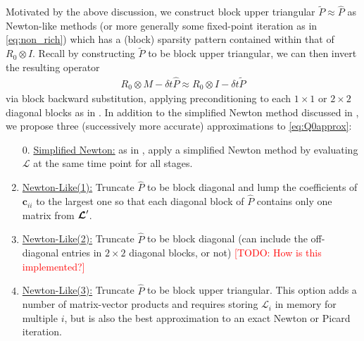 \documentclass[review]{siamart}
\makeatletter
\newcommand{\todo}[1]{\textcolor{red}{[TODO\@: #1]}}
\makeatother
\begin{document}
Motivated by the above discussion, we construct {block upper triangular}
$\widetilde{P} \approx \widehat{P}$ as Newton-like methods (or more
generally some fixed-point iteration as in \eqref{eq:non_rich}) which has
a (block) sparsity pattern contained within that of $R_0 \otimes I$. Recall
by constructing $\widetilde{P}$ to be block upper triangular, we can then
invert the resulting operator
%
\begin{align}
R_0 \otimes M - \delta t \widehat{P} \approx R_0 \otimes I -  \delta t \widetilde{P}
\end{align}
%
via block backward substitution, applying preconditioning to each $1\times 1$
or $2\times 2$ diagonal blocks as in .
In addition to the simplified Newton
method discussed in , we propose three (successively
more accurate) approximations to \eqref{eq:Q0approx}:
\vspace{1ex}
%
\begin{enumerate}
\setlength\itemsep{0.5em}
\item[0.] \underline{Simplified Newton:} as in , apply a
simplified Newton method by evaluating $\mathcal{L}$ at the same time point for
all stages.

\item \underline{Newton-Like(1):} Truncate $\widehat{P}$ to be block diagonal and
lump the coefficients of $\bm{c}_{ii}$ to the largest one so that each diagonal
block of $\widehat{P}$ contains only one matrix from $\bm{{\cal L}}'$.

\item \underline{Newton-Like(2):} Truncate $\widehat{P}$ to be block diagonal
(can include the off-diagonal entries in $2 \times 2$ diagonal blocks, or not)
\todo{How is this implemented?}

\item \underline{Newton-Like(3):} Truncate $\widehat{P}$ to be block upper triangular.
This option adds a number of matrix-vector products and requires storing $\mathcal{L}_i$ 
in memory for multiple $i$, but is also the best approximation to an exact Newton or
Picard iteration.

\end{enumerate}


\end{document}
